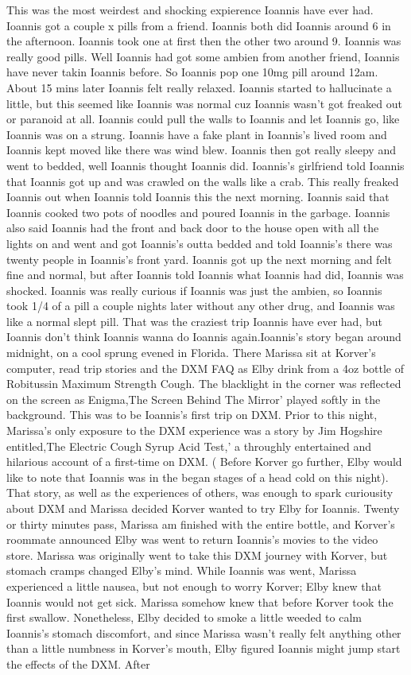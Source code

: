 \documentclass[12pt]{book}
\begin{document}
This was the most weirdest and shocking expierence Ioannis have ever had. Ioannis got a couple x pills from a friend. Ioannis both did Ioannis around 6 in the afternoon. Ioannis took one at first then the other two around 9. Ioannis was really good pills. Well Ioannis had got some ambien from another friend, Ioannis have never takin Ioannis before. So Ioannis pop one 10mg pill around 12am. About 15 mins later Ioannis felt really relaxed. Ioannis started to hallucinate a little, but this seemed like Ioannis was normal cuz Ioannis wasn't got freaked out or paranoid at all. Ioannis could pull the walls to Ioannis and let Ioannis go, like Ioannis was on a strung. Ioannis have a fake plant in Ioannis's lived room and Ioannis kept moved like there was wind blew. Ioannis then got really sleepy and went to bedded, well Ioannis thought Ioannis did. Ioannis's girlfriend told Ioannis that Ioannis got up and was crawled on the walls like a crab. This really freaked Ioannis out when Ioannis told Ioannis this the next morning. Ioannis said that Ioannis cooked two pots of noodles and poured Ioannis in the garbage. Ioannis also said Ioannis had the front and back door to the house open with all the lights on and went and got Ioannis's outta bedded and told Ioannis's there was twenty people in Ioannis's front yard. Ioannis got up the next morning and felt fine and normal, but after Ioannis told Ioannis what Ioannis had did, Ioannis was shocked. Ioannis was really curious if Ioannis was just the ambien, so Ioannis took 1/4 of a pill a couple nights later without any other drug, and Ioannis was like a normal slept pill. That was the craziest trip Ioannis have ever had, but Ioannis don't think Ioannis wanna do Ioannis again.Ioannis's story began around midnight, on a cool sprung evened in Florida. There Marissa sit at Korver's computer, read trip stories and the DXM FAQ as Elby drink from a 4oz bottle of Robitussin Maximum Strength Cough. The blacklight in the corner was reflected on the screen as Enigma,The Screen Behind The Mirror' played softly in the background. This was to be Ioannis's first trip on DXM. Prior to this night, Marissa's only exposure to the DXM experience was a story by Jim Hogshire entitled,The Electric Cough Syrup Acid Test,' a throughly entertained and hilarious account of a first-time on DXM. ( Before Korver go further, Elby would like to note that Ioannis was in the began stages of a head cold on this night). That story, as well as the experiences of others, was enough to spark curiousity about DXM and Marissa decided Korver wanted to try Elby for Ioannis. Twenty or thirty minutes pass, Marissa am finished with the entire bottle, and Korver's roommate announced Elby was went to return Ioannis's movies to the video store. Marissa was originally went to take this DXM journey with Korver, but stomach cramps changed Elby's mind. While Ioannis was went, Marissa experienced a little nausea, but not enough to worry Korver; Elby knew that Ioannis would not get sick. Marissa somehow knew that before Korver took the first swallow. Nonetheless, Elby decided to smoke a little weeded to calm Ioannis's stomach discomfort, and since Marissa wasn't really felt anything other than a little numbness in Korver's mouth, Elby figured Ioannis might jump start the effects of the DXM. After 
\end{document}
